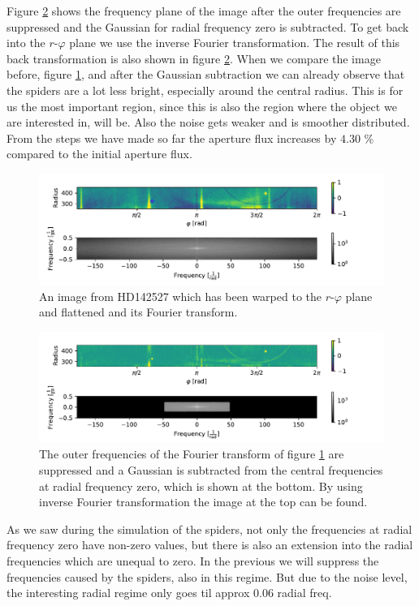 Figure \ref{fig:HDcentralfreq_R254_R454_-1to1} shows the frequency plane of the image after the outer frequencies are suppressed and the Gaussian for radial frequency zero is subtracted. To get back into the $r$-$\varphi$ plane we use the inverse Fourier transformation. The result of this back transformation is also shown in figure \ref{fig:HDcentralfreq_R254_R454_-1to1}. When we compare the image before, figure \ref{fig:HDflatten_R254_R454_-1to1}, and after the Gaussian subtraction we can already observe that the spiders are a lot less bright, especially around the central radius. This is for us the most important region, since this is also the region where the object we are interested in, will be. Also the noise gets weaker and is smoother distributed. \\
From the steps we have made so far the aperture flux increases by $4.30$ \% compared to the initial aperture flux. 
\begin{figure}[H]
	\centering
		\includegraphics[width=1.0\textwidth]{pics/HDflatten_R254_R454_-1to1.pdf}
		\caption{An image from HD142527 which has been warped to the $r$-$\varphi$ plane and flattened and its Fourier transform.}
		\label{fig:HDflatten_R254_R454_-1to1}
\end{figure}
\begin{figure}[H]
	\centering
		\includegraphics[width=1.0\textwidth]{pics/HDcentralfreq_R254_R454_-1to1.pdf}
		\caption{The outer frequencies of the Fourier transform of figure \ref{fig:HDflatten_R254_R454_-1to1} are suppressed and a Gaussian is subtracted from the central frequencies at radial frequency zero, which is shown at the bottom. By using inverse Fourier transformation the image at the top can be found.}
		\label{fig:HDcentralfreq_R254_R454_-1to1}
\end{figure}

As we saw during the simulation of the spiders, not only the frequencies at radial frequency zero have non-zero values, but there is also an extension into the radial frequencies which are unequal to zero. In the previous we will suppress the frequencies caused by the spiders, also in this regime.
But due to the noise level, the interesting radial regime only goes til approx 0.06 radial freq. 